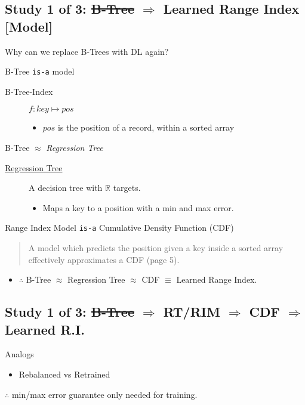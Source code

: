 \documentclass[presentation]{beamer}
\begin{document}
\subsection{Study 1 of 3: \sout{B-Tree} \(\Rightarrow\) Learned Range Index [Model]}
\label{sec:org6219580}
Why can we replace B-Trees with DL again?
\begin{frame}[label={sec:org9de2d07},fragile]{B-Tree \texttt{is-a} model}
 \begin{description}
\item[{B-Tree-Index}] \(f: key \mapsto pos\)
\begin{itemize}
\item \(pos\) is the position of a record, within a \alert{sorted} array
\end{itemize}
\end{description}
\end{frame}
\begin{frame}[label={sec:orgc22cc02}]{B-Tree \(\approx\) \emph{Regression Tree}}
\begin{description}
\item[{\uline{Regression Tree}}] A decision tree with \(\mathbb{R}\) targets.
\begin{itemize}
\item Maps a key to a position with a min and max error.
\end{itemize}
\end{description}
\end{frame}
\begin{frame}[label={sec:org05451a2},fragile]{Range Index Model \texttt{is-a} Cumulative Density Function (CDF)}
 \begin{quote}
A model which predicts the position given a key inside a sorted array effectively approximates a CDF (page 5).
\end{quote}

\begin{itemize}
\item \(\therefore\) \alert{B-Tree} \(\approx\) Regression Tree \(\approx\) CDF \(\equiv\) \alert{Learned Range Index}.
\end{itemize}
\end{frame}

\subsection{Study 1 of 3: \sout{B-Tree} \(\Rightarrow\) RT/RIM \(\Rightarrow\) CDF \(\Rightarrow\) Learned R.I.}
\label{sec:orgc186b1a}
\begin{frame}[label={sec:orga91dc68}]{Analogs}
\begin{itemize}
\item Rebalanced vs Retrained
\end{itemize}

\(\therefore\) min/max error guarantee only needed for training.
\end{frame}
\end{document}
